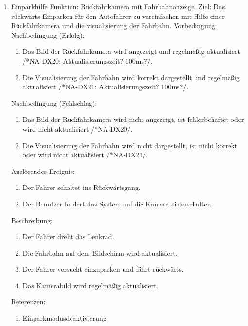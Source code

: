 \documentclass[pflichtenheft.tex]{subfiles}
\begin{document}
\begin{enumerate}
	\item{Einparkhilfe}
	Funktion: Rückfahrkamera mit Fahrbahnanzeige.
	Ziel: Das rückwärts Einparken für den Autofahrer zu vereinfachen mit Hilfe einer Rückfahrkamera und die visualisierung der Fahrbahn.
	Vorbedingung: 
	Nachbedingung (Erfolg):
		\begin{enumerate}
			\item Das Bild der Rückfahrkamera wird angezeigt und regelmäßig aktualisiert /*NA-DX20: Aktualisierungszeit? 100ms?/.
			\item Die Visualisierung der Fahrbahn wird korrekt dargestellt und regelmäßig aktualisiert /*NA-DX21: Aktualisierungszeit? 100ms?/.
		\end{enumerate}
	Nachbedingung (Fehlschlag):
		\begin{enumerate}
			\item Das Bild der Rückfahrkamera wird nicht angezeigt, ist fehlerbehaftet oder wird nicht aktualisiert /*NA-DX20/.
			\item Die Visualisierung der Fahrbahn wird nicht dargestellt, ist nicht korrekt oder wird nicht aktualisiert /*NA-DX21/.
		\end{enumerate}
	Auslösendes Ereignis:
		\begin{enumerate}
			\item Der Fahrer schaltet ins Rückwärtsgang.
			\item Der Benutzer fordert das System auf die Kamera einzuschalten. 
		\end{enumerate}
	Beschreibung:
		\begin{enumerate}
			\item Der Fahrer dreht das Lenkrad.
			\item Die Fahrbahn auf dem Bildschirm wird aktualisiert.
			\item Der Fahrer versucht einzuparken und fährt rückwärts.
			\item Das Kamerabild wird regelmäßig aktualisiert.
		\end{enumerate}
	Referenzen:
		\begin{enumerate}
			\item Einparkmodusdeaktivierung
		\end{enumerate}
		

\end{enumerate}
\end{document}
